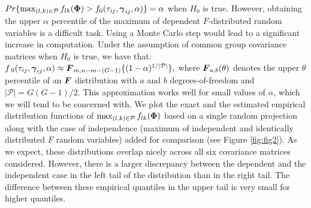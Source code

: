 \documentclass[pdflatex,sn-basic]{sn-jnl}%
\newcommand{\uF}       {\mbox{\boldmath$F$}}
\newcommand{\ugamma}            {\mbox{\boldmath$\gamma$}}
\newcommand{\uPhi}              {\mbox{\boldmath$\Phi$}}
\theoremstyle{thmstyleone}%
\theoremstyle{thmstyletwo}%
\theoremstyle{thmstylethree}%
\begin{document}
$Pr\{\max_{(l, k)\in\mathcal{P}}f_{lk}(\uPhi) > f_{0}(\tau_{ij},\ugamma_{ij}, \alpha)\} = \alpha$ when $H_{0}$ is true. However, obtaining the upper $\alpha$ percentile of the maximum of dependent $F$-distributed random variables is a difficult task. Using a Monte Carlo step would lead to a significant increase in computation. Under the assumption of common group covariance matrices when $H_0$ is true, we have that: 
$f_{\;0}(\tau_{ij},\ugamma_{ij}, \alpha) \approx \uF_{m, n -m -(G-1)}\{(1 - \alpha)^{1/|\mathcal{P}|}\},$ where $\uF_{a, b}(\theta)$ denotes the upper $\theta$ percentile of an $\uF$ distribution with $a$ and $b$ degrees-of-freedom and $|\mathcal{P}| = G(G-1)/2$. This approximation works well for small values of $\alpha$, which we will tend to be concerned with. We plot the exact and the estimated empirical distribution functions of $\max_{(l, k)\in\mathcal{P}}f_{lk}(\uPhi)$ based on a single random projection along with the case of independence (maximum of independent and identically distributed $F$ random variables) added for comparison (see Figure \ref{fig:fig2}). As we expect, these distributions overlap nicely across all six covariance matrices considered. However, there is a larger discrepancy between the dependent and the independent case in the left tail of the distribution than in the right tail. The difference between these empirical quantiles in the upper tail is very small for higher quantiles.
\end{document}
